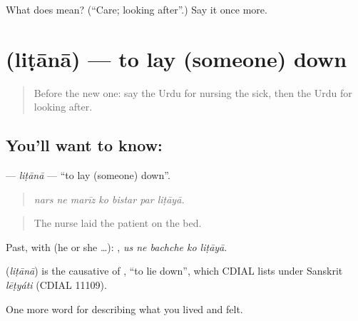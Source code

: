 \begin{tcolorbox}[breakable,colback=teal!4,colframe=teal!35!black,title={Before you move on}]
What does  mean? (\textquotedblleft{}Care; looking after\textquotedblright{}.) Say it once more.
\end{tcolorbox}
\section[\texorpdfstring{\ur{لٹانا} (liṭānā)}{لٹانا (liṭānā)}]{ (liṭānā) — to lay (someone) down}

\label{lesson:UR-C480-litana}



\begin{quote}
Before the new one: say the Urdu for nursing the sick, then the Urdu for looking after.
\end{quote}

\subsection*{You'll want to know: }
\textbf{} — \emph{liṭānā} — \textquotedblleft{}to lay (someone) down\textquotedblright{}.

\begin{quote}
      
\end{quote}

\begin{quote}
\emph{nars ne marīz ko bistar par liṭāyā.}
\end{quote}

\begin{quote}
The nurse laid the patient on the bed.
\end{quote}

Past, with  (he or she …):     , \emph{us ne bachche ko liṭāyā}.

\begin{cousinweb}
\textbf{} (\emph{liṭānā}) is the causative of \textbf{}, \textquotedblleft{}to lie down\textquotedblright{}, which CDIAL lists under Sanskrit \emph{lēṭyáti} (CDIAL 11109).
\end{cousinweb}

\begin{grammarlens}[title={What you've built}]
One more word for describing what you lived and felt.
\end{grammarlens}

